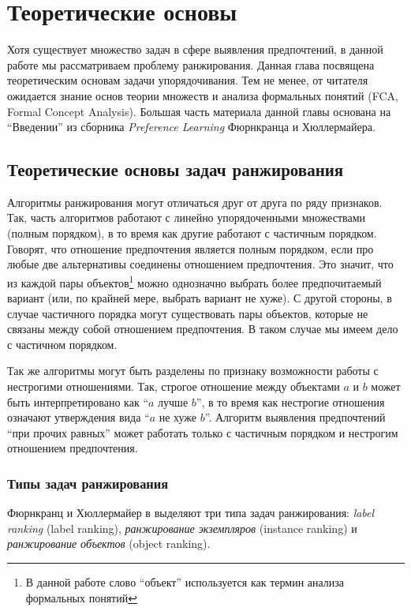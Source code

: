 \chapter{Теоретические основы}
\label{chapter:first}

Хотя существует множество задач в сфере выявления предпочтений, в данной работе мы рассматриваем проблему ранжирования. Данная глава посвящена теоретическим основам задачи упорядочивания. Тем не менее, от читателя ожидается знание основ теории множеств и анализа формальных понятий (FCA, Formal Concept Analysis). Большая часть материала данной главы основана на \enquote{Введении} из сборника \textit{Preference Learning} Фюрнкранца и Хюллермайера\cite{plbook:Introduction:2010}.


\section{Теоретические основы задач ранжирования}

	Алгоритмы ранжирования могут отличаться друг от друга по ряду признаков. Так, часть алгоритмов работают с линейно упорядоченными множествами (полным порядком), в то время как другие работают с частичным порядком. Говорят, что отношение предпочтения является полным порядком, если про любые две альтернативы соединены отношением предпочтения. Это значит, что из каждой пары объектов\footnote{В данной работе слово \enquote{объект} используется как термин анализа формальных понятий} можно однозначно выбрать более предпочитаемый вариант (или, по крайней мере, выбрать вариант не хуже). С другой стороны, в случае частичного порядка могут существовать пары объектов, которые не связаны между собой отношением предпочтения. В таком случае мы имеем дело с частичном порядком. 
	
	Так же алгоритмы могут быть разделены по признаку возможности работы с нестрогими отношениями. Так, строгое отношение между объектами $a$ и $b$ может быть интерпретировано как \enquote{$a$ лучше $b$}, в то время как нестрогие отношения означают утверждения вида \enquote{$a$ не хуже $b$}.\cite[p.~384]{Barten:1982} Алгоритм выявления предпочтений \enquote{при прочих равных} может работать только с частичным порядком и нестрогим отношением предпочтения.

\subsection{Типы задач ранжирования}
	Фюрнкранц и Хюллермайер в \cite{plbook:Introduction:2010} выделяют три типа задач ранжирования: \emph{label ranking} (label ranking), \emph{ранжирование экземпляров} (instance ranking) и \emph{ранжирование объектов} (object ranking).
	
